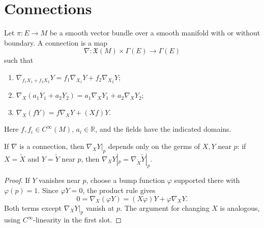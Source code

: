 \section{Connections}

\begin{definition}[Connection]
\label{def:connection}




Let $\pi:E\to M$ be a smooth vector bundle over a smooth manifold with or without boundary. A connection is a map
\[
\nabla:\mathfrak X(M)\times\Gamma(E)\to\Gamma(E)
\]
such that
\begin{enumerate}
\item[(i)] $\nabla_{f_1X_1+f_2X_2}Y=f_1\nabla_{X_1}Y+f_2\nabla_{X_2}Y$;
\item[(ii)] $\nabla_X(a_1Y_1+a_2Y_2)=a_1\nabla_XY_1+a_2\nabla_XY_2$;
\item[(iii)] $\nabla_X(fY)=f\nabla_XY+(Xf)Y$.
\end{enumerate}
Here $f,f_i\in C^\infty(M)$, $a_i\in\mathbb R$, and the fields have the indicated domains.
\end{definition}

\begin{lemma}[Locality]
\label{lem:connection-is-local-operator}





If $\nabla$ is a connection, then $\nabla_XY|_p$ depends only on the germs of $X,Y$ near $p$: if $X=\widetilde X$ and $Y=\widetilde Y$ near $p$, then $\nabla_XY|_p=\nabla_{\widetilde X}\widetilde Y|_p$.
\end{lemma}
\begin{proof}

\sketch If $Y$ vanishes near $p$, choose a bump function $\varphi$ supported there with $\varphi(p)=1$. Since $\varphi Y=0$, the product rule gives
\begin{equation}
0=\nabla_X(\varphi Y)=(X\varphi)Y+\varphi\nabla_XY.\tag{4.5}
\end{equation}
Both terms except $\nabla_XY|_p$ vanish at $p$. The argument for changing $X$ is analogous, using $C^\infty$-linearity in the first slot.
\end{proof}

